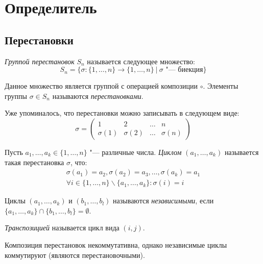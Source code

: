 \section{Определитель}

\subsection{Перестановки}

\begin{definition}
	\textit{Группой перестановок} $S_n$ называется следующее множество:
	\[S_n = \{\sigma: \{1,\dots, n\} \rightarrow \{1,\dots, n\}~|~\sigma \text{ "--- биекция}\}\]
	
	Данное множество является группой с операцией композиции $\circ$. Элементы группы $\sigma \in S_n$ называются \textit{перестановками}.
\end{definition}

\begin{note}
	Уже упоминалось, что перестановки можно записывать в следующем виде:
	\[\sigma = \begin{pmatrix}
	1&2&\dots&n\\
	\sigma(1)&\sigma(2)&\dots&\sigma(n)
	\end{pmatrix}\]
\end{note}

\begin{definition}
	Пусть $a_1, \dots , a_k \in \{1, \dots, n\}$ "--- различные числа. \textit{Циклом} $(a_1, \dots , a_k)$ называется такая перестановка $\sigma$, что:
	\begin{gather*}
		\sigma(a_1) = a_2, \sigma(a_2) = a_3, \dots, \sigma(a_k) = a_1\\
		\forall i \in \{1, \dots, n\} \backslash \{a_1, \dots , a_k\}: \sigma(i) = i
	\end{gather*}
\end{definition}

\begin{definition}
	Циклы $(a_1, \dots , a_k)$ и $(b_1, \dots , b_l)$ называются \textit{независимыми}, если $\{a_1, \dots , a_k\} \cap \{b_1, \dots , b_l\} = \emptyset$.
\end{definition}

\begin{definition}
	\textit{Транспозицией} называется цикл вида $(i, j)$.
\end{definition}

\begin{note}
	Композиция перестановок некоммутативна, однако независимые циклы коммутируют (являются перестановочными).
\end{note}

